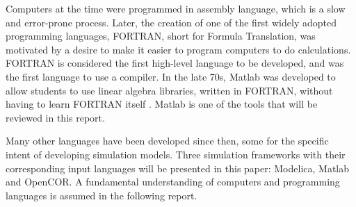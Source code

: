 \documentclass[\rootfolder/main.tex]{subfiles}
\begin{document}
Computers at the time were programmed in assembly language, which is a slow and error-prone process.
Later, the creation of one of the first widely adopted programming languages, FORTRAN, short for Formula Translation, was motivated by a desire to make it easier to program computers to do calculations.
FORTRAN is considered the first high-level language to be developed, and was the first language to use a compiler.
In the late 70s, Matlab was developed to allow students to use linear algebra libraries, written in FORTRAN, without having to learn FORTRAN itself \cite{Moler}.
Matlab is one of the tools that will be reviewed in this report.

Many other languages have been developed since then, some for the specific intent of developing simulation models.
Three simulation frameworks with their corresponding input languages will be presented in this paper: Modelica, Matlab and OpenCOR.
A fundamental understanding of computers and programming languages is assumed in the following report.
\end{document}
